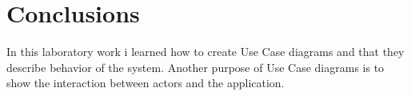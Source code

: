 \section*{Conclusions}
In this laboratory work i learned how to create Use Case diagrams and that they describe behavior of the system.
Another purpose of Use Case diagrams is to show the interaction between actors and the application.
\clearpage